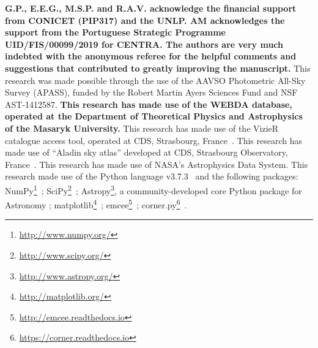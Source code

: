 \documentclass[referee]{aa}
\begin{document}
\begin{acknowledgements}
\textbf{
G.P., E.E.G., M.S.P. and R.A.V. acknowledge the financial support from CONICET 
(PIP317) and the UNLP.
AM acknowledges the support from the Portuguese Strategic Programme
UID/FIS/00099/2019 for CENTRA.
The authors are very much indebted with the anonymous referee for the helpful
comments and suggestions that contributed to greatly improving the manuscript.}
%
This research was made possible through the use of the AAVSO Photometric
All-Sky Survey (APASS), funded by the Robert Martin Ayers Sciences Fund and NSF
AST-1412587.
%
\textbf{This research has made use of the WEBDA database, operated at the Department of
Theoretical Physics and Astrophysics of the Masaryk University.}
%
This research has made use of the VizieR catalogue access tool, operated at CDS,
Strasbourg, France~\citep{Ochsenbein_2000}.
%
This research has made use of ``Aladin sky atlas'' developed at
CDS, Strasbourg Observatory, France~\citep{Bonnarel2000,Boch2014}.
%
This research has made use of NASA's Astrophysics Data System.
%
This research made use of the Python language v3.7.3~\citep{vanRossum_1995}
and the following packages:
NumPy\footnote{\url{http://www.numpy.org/}}~\citep{vanDerWalt_2011};
SciPy\footnote{\url{http://www.scipy.org/}}~\citep{Jones_2001};
Astropy\footnote{\url{http://www.astropy.org/}}, a community-developed core
Python package for Astronomy \citep{Astropy_2013};
matplotlib\footnote{\url{http://matplotlib.org/}}~\citep{hunter_2007};
emcee\footnote{\url{http://emcee.readthedocs.io}}~\citep{emcee};
corner.py\footnote{\url{https://corner.readthedocs.io}}~\citep{corner}.
\end{acknowledgements}



\end{document}
